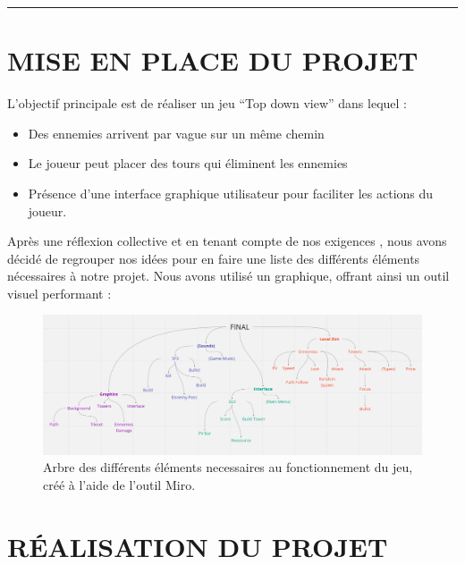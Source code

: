 \documentclass{article}
\begin{document}
\noindent 
\rule{\linewidth}{0.3mm}
%

\section*{MISE EN PLACE DU PROJET}
L’objectif principale est de réaliser un jeu “Top down view” dans lequel : 
\begin{itemize}
    \item Des ennemies arrivent par vague sur un même chemin 
    \item Le joueur peut placer des tours qui éliminent les ennemies 
    \item Présence d’une interface graphique utilisateur pour faciliter les actions du joueur.
\end{itemize}
\vspace{10pt}
Après une réflexion collective et en tenant compte de nos exigences , nous avons décidé de regrouper nos idées pour en faire une liste des différents éléments nécessaires à notre projet. 
Nous avons utilisé un graphique, offrant ainsi un outil visuel performant :

\begin{figure}[h]
    \centering
    \includegraphics[width=1\textwidth]{arbre_elements_jeu.png}
    \caption{Arbre des différents éléments necessaires au fonctionnement du jeu, créé à l'aide de l'outil Miro.}
    \label{fig:arbre_elements_jeu.png}
\end{figure}

\newpage

\section*{RÉALISATION DU PROJET}
\end{document}

